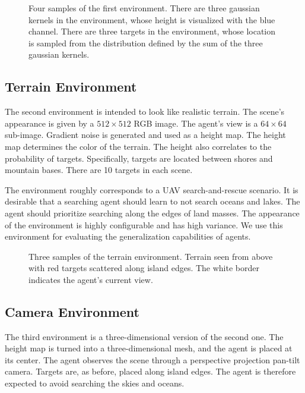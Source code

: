 \begin{figure}
    \centering
    
    \label{fig:gaussian}
    \caption[Gaussian environment]{Four samples of the first environment. There are three gaussian kernels in the environment, whose height is visualized with the blue channel. There are three targets in the environment, whose location is sampled from the distribution defined by the sum of the three gaussian kernels.}
\end{figure}

\subsection{Terrain Environment}

The second environment is intended to look like realistic terrain.
The scene's appearance is given by a \(512 \times 512\) RGB image.
The agent's view is a \(64 \times 64\) sub-image.
Gradient noise is generated and used as a height map.
The height map determines the color of the terrain.
The height also correlates to the probability of targets.
Specifically, targets are located between shores and mountain bases.
There are 10 targets in each scene.

The environment roughly corresponds to a UAV search-and-rescue scenario.
It is desirable that a searching agent should learn to not search oceans and lakes.
The agent should prioritize searching along the edges of land masses.
The appearance of the environment is highly configurable and has high variance.
We use this environment for evaluating the generalization capabilities of agents.

\begin{figure}
    \centering
    
    \label{fig:terrain}
    \caption[Terrain environment]{Three samples of the terrain environment. Terrain seen from above with red targets scattered along island edges. The white border indicates the agent's current view.}
\end{figure}

\subsection{Camera Environment}

The third environment is a three-dimensional version of the second one.
The height map is turned into a three-dimensional mesh, and the agent is placed at its center.
The agent observes the scene through a perspective projection pan-tilt camera.
Targets are, as before, placed along island edges.
The agent is therefore expected to avoid searching the skies and oceans.

